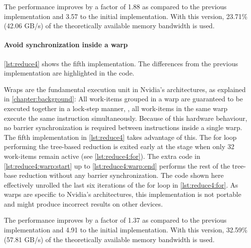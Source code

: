 The performance improves by a factor of 1.88 as compared to the previous implementation and 3.57 to the initial implementation.
With this version, 23.71\% (42.06 GB/s) of the theoretically available memory bandwidth is used.



\FloatBarrier
\newpage
\paragraph{Avoid synchronization inside a warp}

\autoref{lst:reduce4} shows the fifth implementation.
The differences from the previous implementation are highlighted in the code.

Wraps are the fundamental execution unit in Nvidia's \GPU architectures, as explained in \autoref{chapter:background}:
All work-items grouped in a warp are guaranteed to be executed together in a lock-step manner, \ie, all work-items in the same warp execute the same instruction simultaneously.
Because of this hardware behaviour, no barrier synchronization is required between instructions inside a single warp.
The fifth implementation in \autoref{lst:reduce4} takes advantage of this.
The for loop performing the tree-based reduction is exited early at the stage when only 32 work-items remain active (see \autoref{lst:reduce4:for}).
The extra code in \autoref{lst:reduce4:warp:start} up to \autoref{lst:reduce4:warp:end} performs the rest of the tree-base reduction without any barrier synchronization.
The code shown here effectively unrolled the last six iterations of the for loop in \autoref{lst:reduce4:for}.
As warps are specific to Nvidia's \GPU architectures, this implementation is not portable and might produce incorrect results on other \OpenCL devices.

The performance improves by a factor of 1.37 as compared to the previous implementation and 4.91 to the initial implementation.
With this version, 32.59\% (57.81 GB/s) of the theoretically available memory bandwidth is used.

